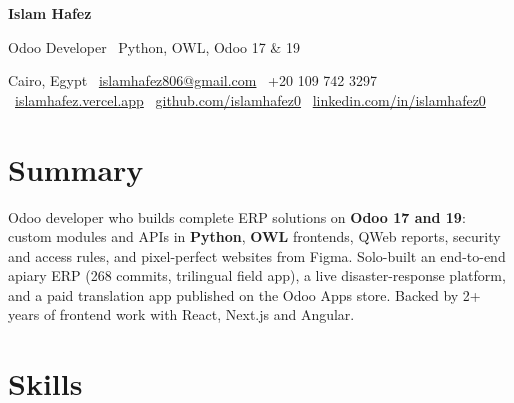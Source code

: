 \documentclass[10pt,a4paper]{article}
\begin{document}
{\LARGE\bfseries\color{accent} Islam Hafez}\par\vspace{2pt}
{\large Odoo Developer \textbar\ Python, OWL, Odoo 17 \& 19}\par\vspace{4pt}
{\small Cairo, Egypt \textbar\ \href{mailto:islamhafez806@gmail.com}{islamhafez806@gmail.com} \textbar\ +20 109 742 3297 \textbar\ \href{https://islamhafez.vercel.app}{islamhafez.vercel.app} \textbar\ \href{https://github.com/islamhafez0}{github.com/islamhafez0} \textbar\ \href{https://www.linkedin.com/in/islamhafez0}{linkedin.com/in/islamhafez0}}

\section*{Summary}
Odoo developer who builds complete ERP solutions on \textbf{Odoo 17 and 19}: custom modules and APIs in
\textbf{Python}, \textbf{OWL} frontends, QWeb reports, security and access rules, and pixel-perfect websites
from Figma. Solo-built an end-to-end apiary ERP (268 commits, trilingual field app), a live disaster-response
platform, and a paid translation app published on the Odoo Apps store. Backed by 2+ years of frontend work
with React, Next.js and Angular.

\section*{Skills}
\end{document}
